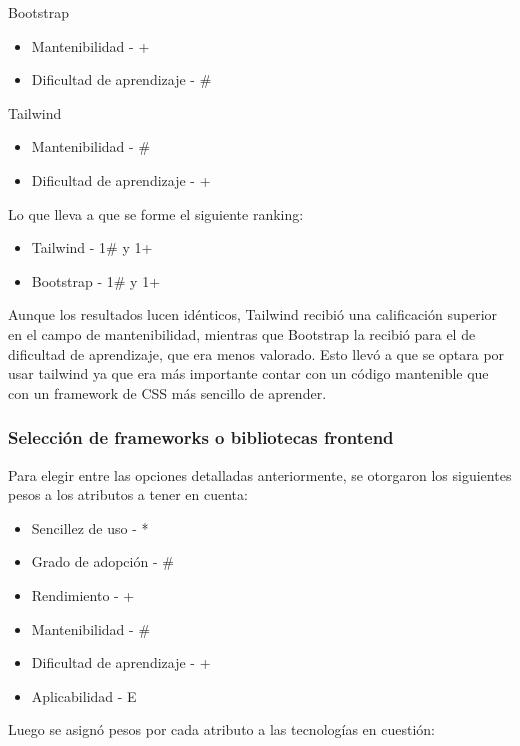 \documentclass[twoside]{article}
\begin{document}
Bootstrap
\begin{itemize}
    \item Mantenibilidad - +
    \item Dificultad de aprendizaje - \#
\end{itemize}
Tailwind
\begin{itemize}
    \item Mantenibilidad - \#
    \item Dificultad de aprendizaje - +
\end{itemize}
Lo que lleva a que se forme el siguiente ranking:
\begin{itemize}
    \item Tailwind - 1\# y 1+
    \item Bootstrap - 1\# y 1+
\end{itemize}
Aunque los resultados lucen idénticos, Tailwind recibió una calificación superior en el campo de mantenibilidad, mientras que Bootstrap la recibió para el de dificultad de aprendizaje, que era menos valorado. Esto llevó a que se optara por usar tailwind ya que era más importante contar con un código mantenible que con un framework de CSS más sencillo de aprender.
\subsubsection{Selección de frameworks o bibliotecas frontend}
Para elegir entre las opciones detalladas anteriormente, se otorgaron los siguientes pesos a los atributos a tener en cuenta:
\begin{itemize}
    \item Sencillez de uso - *
    \item Grado de adopción - \#
    \item Rendimiento - +
    \item Mantenibilidad - \#
    \item Dificultad de aprendizaje - +
    \item Aplicabilidad - E
\end{itemize}
Luego se asignó pesos por cada atributo a las tecnologías en cuestión:
\end{document}
